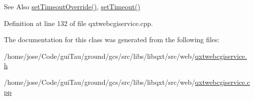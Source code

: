 \begin{DoxySeeAlso}{See Also}
\hyperlink{class_qxt_web_cgi_service_a6931deb479791ab1be40b82bc63494db}{set\-Timeout\-Override()}, \hyperlink{class_qxt_web_cgi_service_a33d4eec39877d21eea2f62610d617bc9}{set\-Timeout()} 
\end{DoxySeeAlso}


Definition at line 132 of file qxtwebcgiservice.\-cpp.



The documentation for this class was generated from the following files\-:\begin{DoxyCompactItemize}
\item 
/home/jose/\-Code/gui\-Tau/ground/gcs/src/libs/libqxt/src/web/\hyperlink{qxtwebcgiservice_8h}{qxtwebcgiservice.\-h}\item 
/home/jose/\-Code/gui\-Tau/ground/gcs/src/libs/libqxt/src/web/\hyperlink{qxtwebcgiservice_8cpp}{qxtwebcgiservice.\-cpp}\end{DoxyCompactItemize}
